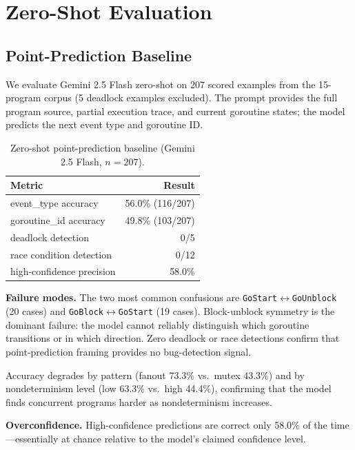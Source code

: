 \documentclass[sigconf,review,anonymous]{acmart}
\begin{document}
\section{Zero-Shot Evaluation}

\subsection{Point-Prediction Baseline}

We evaluate Gemini 2.5 Flash zero-shot on 207 scored examples from the
15-program corpus (5 deadlock examples excluded). The prompt provides the full
program source, partial execution trace, and current goroutine states; the model
predicts the next event type and goroutine ID.

\begin{table}[h]
\centering
\caption{Zero-shot point-prediction baseline (Gemini 2.5 Flash, $n{=}207$).}
\label{tab:baseline}
\begin{tabular}{lr}
\toprule
\textbf{Metric} & \textbf{Result} \\
\midrule
event\_type accuracy       & 56.0\% (116/207) \\
goroutine\_id accuracy     & 49.8\% (103/207) \\
deadlock detection         & 0/5 \\
race condition detection   & 0/12 \\
high-confidence precision  & 58.0\% \\
\bottomrule
\end{tabular}
\end{table}

\textbf{Failure modes.} The two most common confusions are
\texttt{GoStart}$\leftrightarrow$\texttt{GoUnblock} (20 cases) and
\texttt{GoBlock}$\leftrightarrow$\texttt{GoStart} (19 cases). Block-unblock
symmetry is the dominant failure: the model cannot reliably distinguish which
goroutine transitions or in which direction. Zero deadlock or race detections
confirm that point-prediction framing provides no bug-detection signal.

Accuracy degrades by pattern (fanout 73.3\% vs.\ mutex 43.3\%) and by
nondeterminism level (low 63.3\% vs.\ high 44.4\%), confirming that the model
finds concurrent programs harder as nondeterminism increases.

\textbf{Overconfidence.} High-confidence predictions are correct only 58.0\% of
the time---essentially at chance relative to the model's claimed confidence level.
\end{document}
